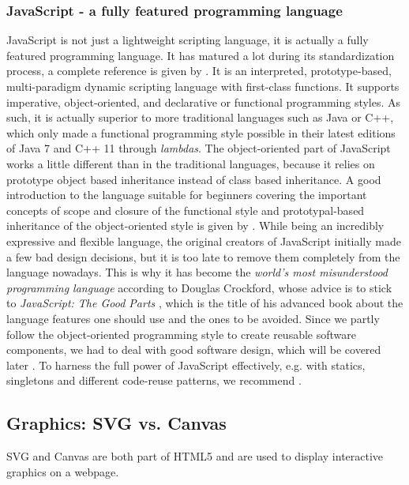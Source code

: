 \subsubsection{JavaScript - a fully featured programming language}
JavaScript is not just a lightweight scripting language, it is actually a fully featured programming language. It has matured a lot during its standardization process, a complete reference is given by \cite{flanagan2011javascript}. It is an interpreted, prototype-based, multi-paradigm dynamic scripting language with first-class functions. It supports imperative, object-oriented, and declarative or functional programming styles. As such, it is actually superior to more traditional languages such as Java or C++, which only made a functional programming style possible in their latest editions of Java 7 and C++ 11 through \textit{lambdas}. The object-oriented part of JavaScript works a little different than in the traditional languages, because it relies on prototype object based inheritance instead of class based inheritance. A good introduction to the language suitable for beginners covering the important concepts of scope and closure of the functional style and prototypal-based inheritance of the object-oriented style is given by \cite{haverbeke2015eloquent,resig2013secrets}.
While being an incredibly expressive and flexible language, the original creators of JavaScript initially made a few bad design decisions, but it is too late to remove them completely from the language nowadays. This is why it has become the \textit{world's most misunderstood programming language} according to Douglas Crockford, whose advice is to stick to \textit{JavaScript: The Good Parts} \cite{crockford2008javascript}, which is the title of his advanced book about the language features one should use and the ones to be avoided.
Since we partly follow the object-oriented programming style to create reusable software components, we had to deal with good software design, which will be covered later . To harness the full power of JavaScript effectively, e.g. with statics, singletons and different code-reuse patterns, we recommend \cite{herman2012effective}.

\subsection{Graphics: SVG vs. Canvas}\label{sec:graphics}
SVG and Canvas are both part of HTML5 and are used to display interactive graphics on a webpage. 

